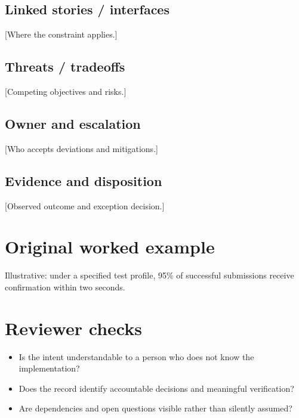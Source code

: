 \documentclass[11pt,letterpaper]{article}
\begin{document}
\subsection{Linked stories / interfaces}
[Where the constraint applies.]

\subsection{Threats / tradeoffs}
[Competing objectives and risks.]

\subsection{Owner and escalation}
[Who accepts deviations and mitigations.]

\subsection{Evidence and disposition}
[Observed outcome and exception decision.]

\section{Original worked example}
\begin{tcolorbox}[colback=tealback,colframe=navy,title={Illustrative entry},breakable]
Illustrative: under a specified test profile, 95\% of successful submissions receive confirmation within two seconds.

\end{tcolorbox}
\section{Reviewer checks}
\begin{itemize}[leftmargin=*,itemsep=2pt]
\item Is the intent understandable to a person who does not know the implementation?
\item Does the record identify accountable decisions and meaningful verification?
\item Are dependencies and open questions visible rather than silently assumed?
\end{itemize}
\end{document}
